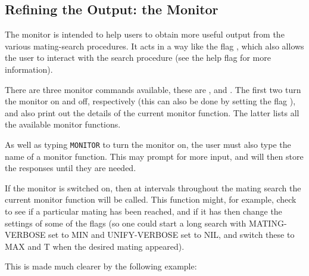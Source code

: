 \subsection{Refining the Output: the Monitor}

The monitor is intended to help users to obtain more useful output from the various mating-search procedures.
It acts in a way like the flag , which also allows the user to interact with
the search procedure (see the help flag for more information).

There are three monitor commands available, these are , 
and . The first two turn the monitor on and off, respectively (this can also
be done by setting the flag ), and also
print out the details of the current monitor function. The latter lists all the available monitor functions.

As well as typing {\tt MONITOR} to turn the monitor on, the user must also type the name of a monitor
function. This may prompt for more input, and will then store the responses until they are needed.

If the monitor is switched on, then at intervals throughout the mating search  the current monitor
function will be called. This function might, for example, check to see if a particular mating has been
reached, and if it has then change the settings of some of the flags (so one could start a long search with
MATING-VERBOSE set to MIN and UNIFY-VERBOSE set to NIL, and switch these to MAX and T when the desired mating
appeared).

This is made much clearer by the following example:

